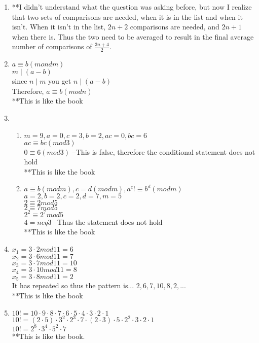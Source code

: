\documentclass{article}
\begin{document}
\begin{enumerate}
\item **I didn't understand what the question was asking before, but now I realize that two sets of comparisons are needed, when it is in the list and when it isn't. When it isn't in the list, $2n+2$ comparisons are needed, and $2n+1$ when there is. Thus the two need to be averaged to result in the final average number of comparisons of $\frac{3n+4}{2}$.

\item
	$a \equiv b(mond m)$ \\
	$m \mid (a-b)$ \\
	since $n \mid m$ you get $n \mid (a-b)$ \\
	Therefore, $a \equiv b(mod n)$ \\
	**This is like the book

\item
	\begin{enumerate}
	\item $m=9, a =0, c=3, b=2, ac=0, bc=6$ \\
				$ac \equiv bc (mod 3)$ \\
				$0 \equiv 6 (mod 3)$ --This is false, therefore the conditional statement does not hold \\
				**This is like the book
	\item $a \equiv b (mod m), c = d(modm), a^c !\equiv b^d (modm)$ \\
				$a = 2, b = 2, c = 2, d = 7, m= 5$ \\
				$2 \equiv 2 mod 5$ \\
				$2 \equiv 7 mod 5$ \\
				$2^2 \equiv 2^7 mod 5$ \\
				$4 =neq 3$ --Thus the statement does not hold \\
				**This is like the book
	\end{enumerate}

\item $x_1 = 3 \cdot 2 mod 11 = 6$ \\
			$x_2 = 3 \cdot 6 mod 11 = 7$ \\
			$x_3 = 3 \cdot 7 mod 11 = 10$ \\
			$x_4 = 3 \cdot 10 mod 11 = 8$ \\
			$x_5 = 3 \cdot 8 mod 11 = 2$ \\
			It has repeated so thus the pattern is... $2,6,7,10,8,2,...$ \\
			**This is like the book

\item $10! = 10 \cdot 9 \cdot 8 \cdot 7 \cdot 6 \cdot 5 \cdot 4 \cdot 3 \cdot 2 \cdot 1$ \\
			$10! = (2 \cdot 5) \cdot 3^2 \cdot 2^3 \cdot 7\cdot (2 \cdot 3) \cdot 5 \cdot 2^2 \cdot 3 \cdot 2 \cdot 1$ \\
			$10! = 2^8 \cdot 3^4 \cdot 5^2 \cdot 7$ \\
			**This is like the book.


\end{enumerate}
\end{document}
